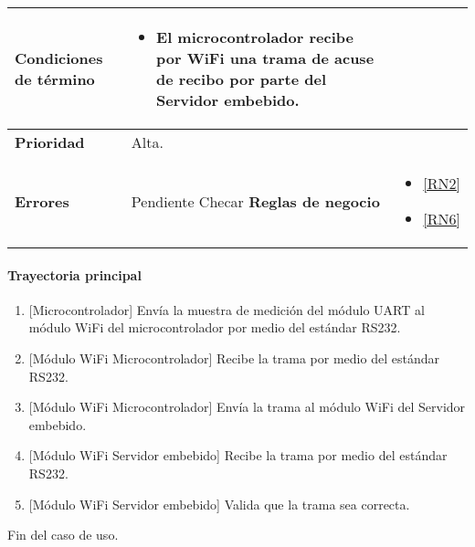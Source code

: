 \begin{longtable}{|J{5cm}|J{10.3cm}|}
	\textbf{Condiciones de término} & 
		\begin{itemize}
		    \item El microcontrolador recibe por WiFi una trama de acuse de recibo por parte del Servidor embebido.
		\end{itemize} 
		\\ \hline 
	\textbf{Prioridad} & 
		Alta. \\ \hline
	\textbf{Errores} & Pendiente Checar
	\textbf{Reglas de negocio} & 
	    \begin{itemize}
	      \item  \ref{RN2}
	      \item  \ref{RN6}
		 \end{itemize}%
\end{longtable}

\paragraph{Trayectoria principal}
\label{SUB-M-CU1.4:TP}
	\begin{enumerate}
	    \item {[Microcontrolador]} Envía la muestra de medición del módulo UART al módulo WiFi del microcontrolador por medio del estándar RS232.
	    \item {[Módulo WiFi Microcontrolador]} Recibe la trama por medio del estándar RS232.
	    \item {[Módulo WiFi Microcontrolador]} Envía la trama al módulo WiFi del Servidor embebido.
	    \item {[Módulo WiFi Servidor embebido]} Recibe la trama por medio del estándar RS232.
	    \item {[Módulo WiFi Servidor embebido]} Valida que la trama sea correcta. %
	\end{enumerate}
	Fin del caso de uso.

